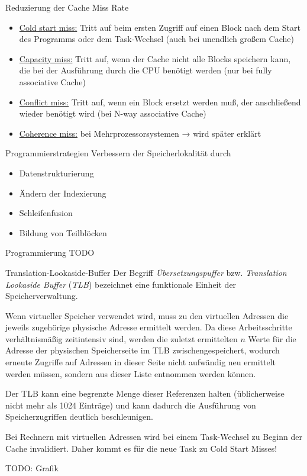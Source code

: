 \begin{defi}{Reduzierung der Cache Miss Rate}
    \begin{itemize}
        \item \underline{Cold start miss:} Tritt auf beim ersten Zugriff auf einen Block nach dem Start des Programms oder dem Task-Wechsel (auch bei unendlich großem Cache)
        \item \underline{Capacity miss:} Tritt auf, wenn der Cache nicht alle Blocks speichern kann, die bei der Ausführung durch die CPU benötigt werden (nur bei fully associative Cache)
        \item \underline{Conflict miss:} Tritt auf, wenn ein Block ersetzt werden muß, der anschließend wieder benötigt wird (bei N-way associative Cache)
        \item \underline{Coherence miss:} bei Mehrprozessorsystemen → wird später erklärt
    \end{itemize}
\end{defi}

\begin{defi}{Programmierstrategien}
    Verbessern der Speicherlokalität durch
    \begin{itemize}[\ldots]
        \item Datenstrukturierung
        \item Ändern der Indexierung
        \item Schleifenfusion
        \item Bildung von Teilblöcken
    \end{itemize}
\end{defi}

\begin{example}{Programmierung}
    TODO
\end{example}

\begin{defi}{Translation-Lookaside-Buffer}
    Der Begriff \emph{Übersetzungspuffer} bzw. \emph{Translation Lookaside Buffer} (\emph{TLB}) bezeichnet eine funktionale Einheit der Speicherverwaltung.

    Wenn virtueller Speicher verwendet wird, muss zu den virtuellen Adressen die jeweils zugehörige physische Adresse ermittelt werden.
    Da diese Arbeitsschritte verhältnismäßig zeitintensiv sind, werden die zuletzt ermittelten $n$ Werte für die Adresse der physischen Speicherseite im TLB zwischengespeichert, wodurch erneute Zugriffe auf Adressen in dieser Seite nicht aufwändig neu ermittelt werden müssen, sondern aus dieser Liste entnommen werden können.

    Der TLB kann eine begrenzte Menge dieser Referenzen halten (üblicherweise nicht mehr als 1024 Einträge) und kann dadurch die Ausführung von Speicherzugriffen deutlich beschleunigen.

    Bei Rechnern mit virtuellen Adressen wird bei einem Task-Wechsel zu Beginn der Cache invalidiert.
    Daher kommt es für die neue Task zu Cold Start Misses!

    TODO: Grafik
\end{defi}

